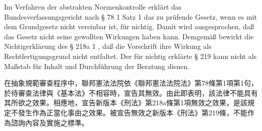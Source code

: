 \documentclass[12pt]{article}
\begin{document}
\begin{sourcepara}[title={原文E.265}]
Im Verfahren der abstrakten Normenkontrolle erklärt das Bundesverfassungsgericht nach § 78 \abbrAbs{} 1 Satz 1 \abbrBVerfGG{} das zu prüfende Gesetz, wenn es mit dem Grundgesetz nicht vereinbar ist, für nichtig. Damit wird ausgesprochen, daß das Gesetz nicht seine gewollten Wirkungen haben kann. Demgemäß bewirkt die Nichtigerklärung des § 218a \abbrAbs{} 1 \abbrStGB{} \abbrNF{}, daß die Vorschrift ihre Wirkung als Rechtfertigungsgrund nicht entfaltet. Der für nichtig erklärte § 219 \abbrStGB{} \abbrNF{} kann nicht als Maßstab für Inhalt und Durchführung der Beratung dienen.
\end{sourcepara}
\begin{transpara}
在抽象規範審查程序中，聯邦憲法法院依《聯邦憲法法院法》第78條第1項第1句，於待審查法律與《基本法》不相容時，宣告其無效。由此即表明，該法律不能具有其所欲之效果。相應地，宣告新版本《刑法》第218a條第1項無效之效果，是該規定不發生作為正當化事由之效果。被宣告無效之新版本《刑法》第219條，不能作為諮詢內容及實施之標準。
\end{transpara}
\end{document}
